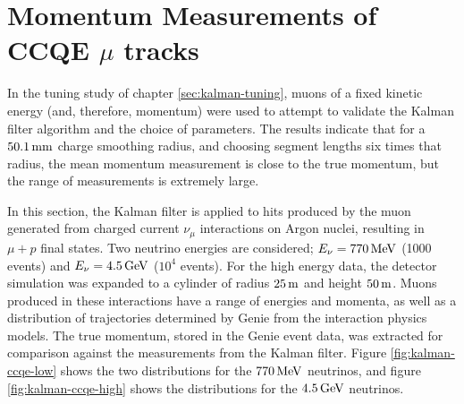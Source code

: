 \section{Momentum Measurements of CCQE $\mu$ tracks}
In the tuning study of chapter \ref{sec:kalman-tuning}, muons of a fixed kinetic energy (and, therefore, momentum) were used to attempt to validate the Kalman filter algorithm and the choice of parameters. The results indicate that for a $50.1\mm$ charge smoothing radius, and choosing segment lengths six times that radius, the mean momentum measurement is close to the true momentum, but the range of measurements is extremely large.

In this section, the Kalman filter is applied to hits produced by the muon generated from charged current $\nu_\mu$ interactions on Argon nuclei, resulting in $\mu + p$ final states. Two neutrino energies are considered; $E_\nu = 770\MeV$ (1000 events) and $E_\nu = 4.5\GeV$ ($10^4$ events). For the high energy data, the detector simulation was expanded to a cylinder of radius $25\metre$ and height $50\metre$. Muons produced in these interactions have a range of energies and momenta, as well as a distribution of trajectories determined by Genie from the interaction physics models. The true momentum, stored in the Genie event data, was extracted for comparison against the measurements from the Kalman filter. Figure \ref{fig:kalman-ccqe-low} shows the two distributions for the $770\MeV$ neutrinos, and figure \ref{fig:kalman-ccqe-high} shows the distributions for the $4.5\GeV$ neutrinos.

